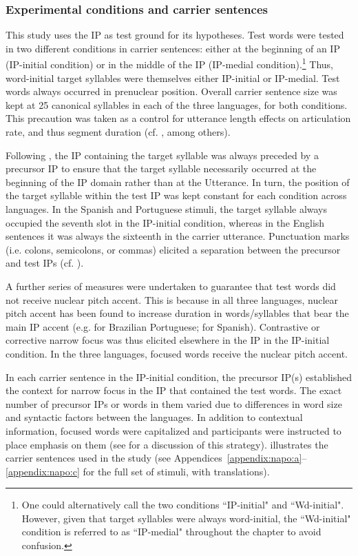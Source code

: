 \documentclass[output=paper]{langscibook}
\begin{document}
\subsubsection{Experimental conditions and carrier sentences}
This study uses the IP as test ground for its hypotheses. Test words were tested in two different conditions in carrier sentences: either at the beginning of an IP (IP-initial condition) or in the middle of the IP (IP-medial condition).\footnote{One could alternatively call the two conditions ``IP-initial" and ``Wd-initial". However, given that target syllables were always word-initial, the ``Wd-initial" condition is referred to as ``IP-medial" throughout the chapter to avoid confusion.} Thus, word-initial target syllables were themselves either IP-initial or IP-medial. Test words always occurred in prenuclear position. Overall carrier sentence size was kept at 25 canonical syllables in each of the three languages, for both conditions. This precaution was taken as a control for utterance length effects on articulation rate, and thus segment duration (cf. \citealt{fm60}, among others). 

Following \citet{cm05}, the IP containing the target syllable was always preceded by a precursor IP to ensure that the target syllable necessarily occurred at the beginning of the IP domain rather than at the Utterance. In turn, the position of the target syllable within the test IP was kept constant for each condition across languages. In the Spanish and Portuguese stimuli, the target syllable always occupied the seventh slot in the IP-initial condition, whereas in the English sentences it was always the sixteenth in the carrier utterance. Punctuation marks (i.e. colons, semicolons, or commas) elicited a separation between the precursor and test IPs (cf. \citealt{ts97, k04}).  

A further series of measures were undertaken to guarantee that test words did not receive nuclear pitch accent. This is because in all three languages, nuclear pitch accent has been found to increase duration in words/syllables that bear the main IP accent (e.g. \citealt{c13} for Brazilian Portuguese; \citealt{hp15} for Spanish). Contrastive or corrective narrow focus was thus elicited elsewhere in the IP in the IP-initial condition. In the three languages, focused words receive the nuclear pitch accent.

In each carrier sentence in the IP-initial condition, the precursor IP(s) established the context for narrow focus in the IP that contained the test words. The exact number of precursor IPs or words in them varied due to differences in word size and syntactic factors between the languages. In addition to contextual information, focused words were capitalized and participants were instructed to place emphasis on them (see \citealt{tns06} for a discussion of this strategy).  illustrates the carrier sentences used in the study (see Appendices~\ref{appendix:napo:a}--\ref{appendix:napo:c} for the full set of stimuli, with translations).
\end{document}
